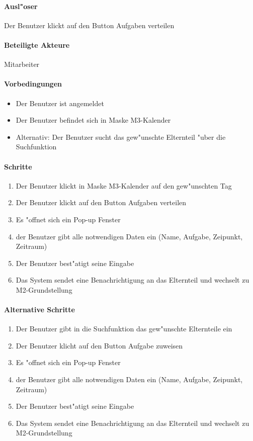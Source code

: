   \paragraph{Ausl"oser}
  Der Benutzer klickt auf den Button \dq Aufgaben verteilen\dq
  \paragraph{Beteiligte Akteure}   \leavevmode \newline
    Mitarbeiter
  \paragraph{Vorbedingungen}
  \begin{itemize}
   \item Der Benutzer ist angemeldet
   \item Der Benutzer befindet sich in Maske M3-Kalender
   \item Alternativ: Der Benutzer sucht das gew"unschte Elternteil "uber die Suchfunktion
  \end{itemize}

  \paragraph{Schritte}
  \begin{enumerate}
  \item Der Benutzer klickt in Maske M3-Kalender auf den gew"unschten Tag
  \item Der Benutzer klickt auf den Button \dq Aufgaben verteilen\dq
  \item Es "offnet sich ein Pop-up Fenster
  \item der Benutzer gibt alle notwendigen Daten ein (Name, Aufgabe, Zeipunkt, Zeitraum)
  \item Der Benutzer best"atigt seine Eingabe
  \item Das System sendet eine Benachrichtigung an das Elternteil und wechselt zu M2-Grundstellung
  \end{enumerate}
  
  \paragraph{Alternative Schritte}
  \begin{enumerate}
   \item Der Benutzer gibt in die Suchfunktion das gew"unschte Elternteile ein
   \item Der Benutzer klicht auf den Button \dq Aufgabe zuweisen\dq
   \item Es "offnet sich ein Pop-up Fenster
  \item der Benutzer gibt alle notwendigen Daten ein (Name, Aufgabe, Zeipunkt, Zeitraum)
  \item Der Benutzer best"atigt seine Eingabe
  \item Das System sendet eine Benachrichtigung an das Elternteil und wechselt zu M2-Grundstellung
  \end{enumerate}
